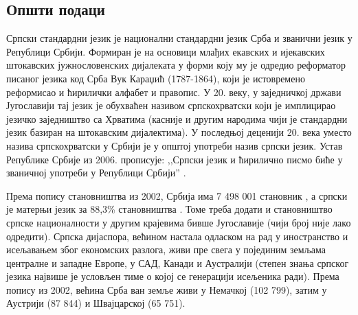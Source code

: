 \clearpage

\begin{multicols}{2}


\subsection{Општи подаци}


Српски стандардни језик је национални стандардни језик Срба и званични језик у Републици Србији. Формиран је на основици млађих екавских и ијекавских штокавских јужнословенских дијалеката у форми коју му је одредио реформатор писаног језика код Срба Вук Караџић (1787-1864), који је истовремено реформисао и ћирилички алфабет и правопис. У 20. веку,  у заједничкој држави Југославији тај језик је обухваћен називом српскохрватски који је имплицирао језичко заједништво са Хрватима (касније и другим народима чији је стандардни језик базиран на штокавским дијалектима). У последњој деценији 20. века уместо назива српскохрватски у Србији је у општој употреби  назив српски језик. Устав Републике Србије из 2006. прописује: ,,Српски језик и ћирилично писмо биће у званичној употреби у Републици Србији'' \cite{Ustav}.

Према попису становништва из 2002, Србија има 7 498 001 становник \cite{VJN3}, а српски је матерњи језик за 88,3\% становништва \cite{HDR}. Томе треба додати и становништво српске националности у другим крајевима бивше Југославије (чији  број није лако одредити). Српска дијаспора, већином настала одласком на рад у иностранство и исељавањем због економских разлога, живи пре свега у појединим земљама централне и западне Европе, у САД, Канади и Аустралији (степен знања српског језика највише је у\-сло\-вљен тиме о којој се генерацији исељеника ради). Према попису из 2002, већина Срба ван земље живи у Немачкој (102 799), затим у Аустрији (87 844) и Швајцарској (65 751). 



\end{multicols}
